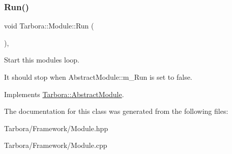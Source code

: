 \subsubsection{\texorpdfstring{Run()}{Run()}}
{\footnotesize\ttfamily void Tarbora\+::\+Module\+::\+Run (\begin{DoxyParamCaption}{ }\end{DoxyParamCaption})\hspace{0.3cm}{\ttfamily [override]}, {\ttfamily [virtual]}}



Start this module\textquotesingle{}s loop. 

It should stop when Abstract\+Module\+::m\+\_\+\+Run is set to false. 

Implements \hyperlink{classTarbora_1_1AbstractModule_abc4de331276ff78b18efafe14498bf21}{Tarbora\+::\+Abstract\+Module}.



The documentation for this class was generated from the following files\+:\begin{DoxyCompactItemize}
\item 
Tarbora/\+Framework/Module.\+hpp\item 
Tarbora/\+Framework/Module.\+cpp\end{DoxyCompactItemize}
